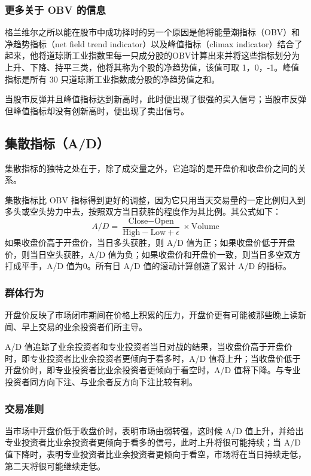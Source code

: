 \subsubsection*{更多关于 OBV 的信息}
格兰维尔之所以能在股市中成功择时的另一个原因是他将能量潮指标（OBV）和净趋势指标（net field trend indicator）以及峰值指标（climax indicator）结合了起来，他将道琼斯工业指数里每一只成分股的OBV计算出来并将这些指标划分为上升、下降、持平三类，他将其称为个股的净趋势值，该值可取 1，0，-1。峰值指标是所有 30 只道琼斯工业指数成分股的净趋势值之和。

当股市反弹并且峰值指标达到新高时，此时便出现了很强的买入信号；当股市反弹但峰值指标却没有创新高时，便出现了卖出信号。
\subsection{集散指标（A/D）}
集散指标的独特之处在于，除了成交量之外，它追踪的是开盘价和收盘价之间的关系。

集散指标比 OBV 指标得到更好的调整，因为它只用当天交易量的一定比例归入到多头或空头势力中去，按照双方当日获胜的程度作为其比例。其公式如下：
\begin{equation}
    A/D=\frac{\text{Close}-\text{Open}}{\text{High}-\text{Low}+\epsilon}\times \text{Volume}
\end{equation}
如果收盘价高于开盘价，当日多头获胜，则 A/D 值为正；如果收盘价低于开盘价，则当日空头获胜，A/D 值为负；如果收盘价和开盘价一致，则当日多空双方打成平手，A/D 值为0。所有日 A/D 值的滚动计算创造了累计 A/D 的指标。
\subsubsection*{群体行为}
开盘价反映了市场闭市期间在价格上积累的压力，开盘价更有可能被那些晚上读新闻、早上交易的业余投资者们所主导。

A/D 值追踪了业余投资者和专业投资者当日对战的结果，当收盘价高于开盘价时，即专业投资者比业余投资者更倾向于看多时，A/D 值将上升；当收盘价低于开盘价时，即专业投资者比业余投资者更倾向于看空时，A/D 值将下降。与专业投资者同方向下注、与业余者反方向下注比较有利。

\subsubsection*{交易准则}
当市场中开盘价低于收盘价时，表明市场由弱转强，这时候 A/D 值上升，并给出专业投资者比业余投资者更倾向于看多的信号，此时上升将很可能持续；当 A/D 值下降时，表明专业投资者比业余投资者更倾向于看空，市场将在当日持续走低，第二天将很可能继续走低。

